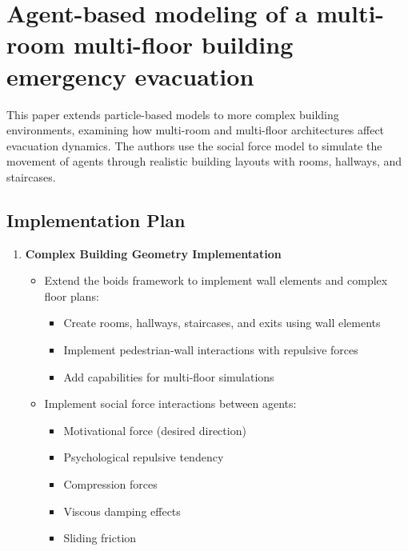 \section{Agent-based modeling of a multi-room multi-floor building emergency evacuation}
This paper \cite{HA20122740} extends particle-based models to more complex building environments, examining how multi-room and multi-floor architectures affect evacuation dynamics. The authors use the social force model to simulate the movement of agents through realistic building layouts with rooms, hallways, and staircases.
\subsection{Implementation Plan}
\begin{enumerate}
	\item \textbf{Complex Building Geometry Implementation}
	      \begin{itemize}
		      \item Extend the boids framework to implement wall elements and complex floor plans:
		            \begin{itemize}
			            \item Create rooms, hallways, staircases, and exits using wall elements
			            \item Implement pedestrian-wall interactions with repulsive forces
			            \item Add capabilities for multi-floor simulations
		            \end{itemize}
		      \item Implement social force interactions between agents:
		            \begin{itemize}
			            \item Motivational force (desired direction)
			            \item Psychological repulsive tendency
			            \item Compression forces
			            \item Viscous damping effects
			            \item Sliding friction
		            \end{itemize}
	      \end{itemize}


\end{enumerate}
